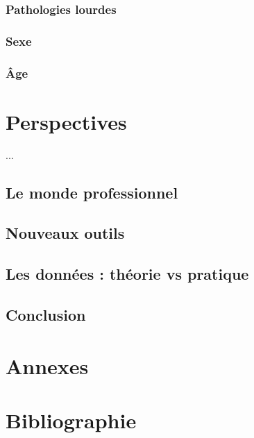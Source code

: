 \documentclass{book}
\begin{document}
\subsubsection{Pathologies lourdes}
\subsubsection{Sexe}
\subsubsection{Âge}

\newpage
\section{Perspectives}
...
\subsection{Le monde professionnel}
\subsection{Nouveaux outils}
\subsection{Les données : théorie vs pratique}

\newpage
\begin{center}
\section*{Conclusion}
\end{center}

\backmatter
\section{Annexes}
\section{Bibliographie}
\end{document}
